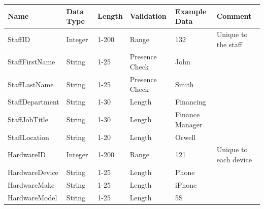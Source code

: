 \begin{center}
\begin{tabular}{|p{4cm}|p{1.3cm}|p{1.1cm}|p{1.7cm}|p{1.7cm}|p{2cm}|}
\hline
\textbf{Name} & \textbf{Data Type}& \textbf{Length} & \textbf{Validation} & \textbf{Example Data} & \textbf{Comment}      \\ \hline
StaffID                             & Integer                                 & 1-200                                & Range                                    & 132                   & Unique to the staff   \\ \hline
StaffFirstName                      & String                                  & 1-25                                 & Presence Check                           & John                  &                       \\ \hline
StaffLastName                       & String                                  & 1-25                                 & Presence Check                           & Smith                 &                       \\ \hline
StaffDepartment                     & String                                  & 1-30                                 & Length                                   & Financing             &                       \\ \hline
StaffJobTitle			& String				& 1-30			& Length			& Finance Manager		&		\\ \hline
StaffLocation                       & String                                  & 1-20                                 & Length                                   & Orwell                &                       \\ \hline
HardwareID                          & Integer                                 & 1-200                                & Range                                    & 121                   & Unique to each device \\ \hline
HardwareDevice                      & String                                  & 1-25                                 & Length                                   & Phone                 &                       \\ \hline
HardwareMake                        & String                                  & 1-25                                 & Length                                   & iPhone                &                       \\ \hline
HardwareModel                       & String                                  & 1-25                                 & Length                                   & 5S                    &                       \\ \hline

\end{tabular}
\end{center}
